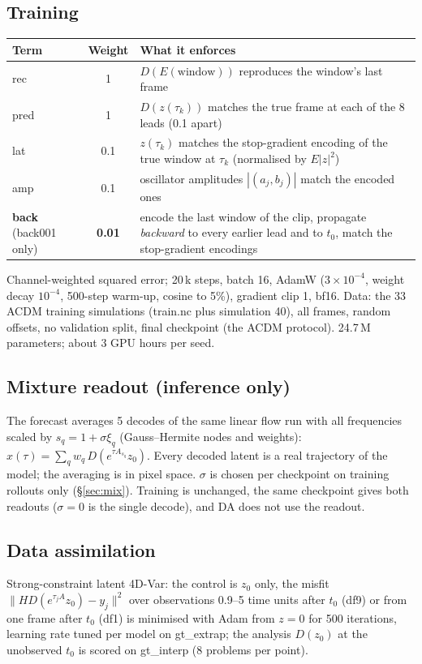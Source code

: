 \documentclass[10.5pt,a4paper]{article}
\begin{document}
\subsection{Training}
\begin{center}\small
\begin{tabularx}{\linewidth}{lcY}
\toprule
Term & Weight & What it enforces\\
\midrule
rec & 1 & $D(E(\text{window}))$ reproduces the window's last frame\\
pred & 1 & $D(z(\tau_k))$ matches the true frame at each of the 8 leads (0.1 apart)\\
lat & 0.1 & $z(\tau_k)$ matches the stop-gradient encoding of the true window at $\tau_k$
  (normalised by $E|z|^2$)\\
amp & 0.1 & oscillator amplitudes $|(a_j,b_j)|$ match the encoded ones\\
\textbf{back} (back001 only) & \textbf{0.01} & encode the last window of the clip, propagate
  \emph{backward} to every earlier lead and to $t_0$, match the stop-gradient encodings\\
\bottomrule
\end{tabularx}
\end{center}
Channel-weighted squared error; 20\,k steps, batch 16, AdamW ($3\times10^{-4}$, weight decay
$10^{-4}$, 500-step warm-up, cosine to 5\%), gradient clip 1, bf16. Data: the 33 ACDM training
simulations (train.nc plus simulation 40), all frames, random offsets, no validation split,
final checkpoint (the ACDM protocol). 24.7\,M parameters; about 3 GPU hours per seed.

\subsection{Mixture readout (inference only)}
The forecast averages 5 decodes of the same linear flow run with all frequencies scaled by
$s_q=1+\sigma\xi_q$ (Gauss--Hermite nodes and weights):
$\hat x(\tau)=\sum_q w_q\,D\!\left(e^{\tau A_{s_q}}z_0\right)$. Every decoded latent is a real
trajectory of the model; the averaging is in pixel space. $\sigma$ is chosen per checkpoint
on training rollouts only (\S\ref{sec:mix}). Training is unchanged, the same checkpoint
gives both readouts ($\sigma=0$ is the single decode), and DA does not use the readout.

\subsection{Data assimilation}
Strong-constraint latent 4D-Var: the control is $z_0$ only, the misfit
$\|H D(e^{\tau_j A}z_0)-y_j\|^2$ over observations 0.9--5 time units after $t_0$ (df9) or from
one frame after $t_0$ (df1) is minimised with Adam from $z=0$ for 500 iterations, learning
rate tuned per model on gt\_extrap; the analysis $D(z_0)$ at the unobserved $t_0$ is scored
on gt\_interp (8 problems per point).
\end{document}
